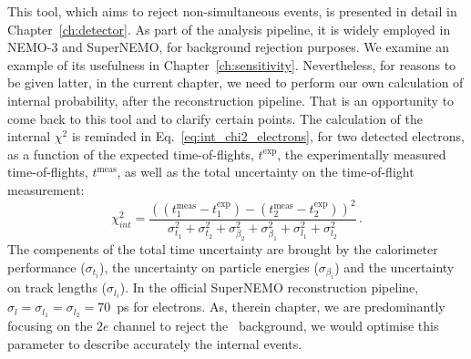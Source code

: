 This tool, which aims to reject non-simultaneous events, is presented in detail in Chapter~\ref{ch:detector}.
As part of the analysis pipeline, it is widely employed in NEMO-$3$ and SuperNEMO, for background rejection purposes.
We examine an example of its usefulness in Chapter~\ref{ch:sensitivity}.
Nevertheless, for reasons to be given latter, in the current chapter, we need to perform our own calculation of internal probability, after the reconstruction pipeline.
That is an opportunity to come back to this tool and to clarify certain points.
The calculation of the internal $\chi^{2}$ is reminded in Eq.~\eqref{eq:int_chi2_electrons}, for two detected electrons, as a function of the expected time-of-flights, $t^{\text{exp}}$, the experimentally measured time-of-flights, $t^{\text{meas}}$, as well as the total uncertainty on the time-of-flight measurement:
\begin{equation}
  \chi^{2}_{int}=\frac{((t^{\text{meas}}_{1} - t^{\text{exp}}_{1}) - (t^{\text{meas}}_{2} - t^{\text{exp}}_{2}))^{2}}{\sigma_{t_{1}}^{2}+\sigma_{t_{2}}^{2}+\sigma_{\beta_{2}}^{2}+\sigma_{\beta_{1}}^{2}+\sigma_{l_{1}}^{2}+\sigma_{l_{2}}^{2}}\,.
  \label{eq:int_chi2_electrons}
\end{equation}
The compenents of the total time uncertainty are brought by the calorimeter performance ($\sigma_{t_{i}}$), the uncertainty on particle energies ($\sigma_{\beta_{i}}$) and the uncertainty on track lengths ($\sigma_{l_{i}}$).
In the official SuperNEMO reconstruction pipeline, ${\sigma_{l}=\sigma_{l_{1}}=\sigma_{l_{2}}=70}$~ps for electrons.
As, therein chapter, we are predominantly focusing on the $2e$ channel to reject the \Tl\ background, we would optimise this parameter to describe accurately the internal events.

